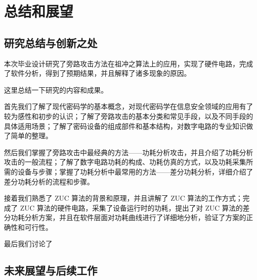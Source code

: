 
\chapter{总结和展望}

\label{chap:conclusion}

\section{研究总结与创新之处}

本次毕业设计研究了旁路攻击方法在祖冲之算法上的应用，实现了硬件电路，完成了软件分析，得到了预期结果，并且解释了诸多现象的原因。

\vspace*{0.5\baselineskip}

这里总结一下研究的内容和成果。

首先我们了解了现代密码学的基本概念，对现代密码学在信息安全领域的应用有了较为感性和初步的认识；了解了旁路攻击的基本分类和常见手段，以及不同手段的具体适用场景；了解了密码设备的组成部件和基本结构，对数字电路的专业知识做了简单的整理。

然后我们掌握了旁路攻击中最经典的方法——功耗分析攻击，并且介绍了功耗分析攻击的一般流程；了解了数字电路功耗的构成、功耗仿真的方式，以及功耗采集所需的设备与步骤；掌握了功耗分析中最常用的方法——差分功耗分析，详细介绍了差分功耗分析的流程和步骤。

接着我们熟悉了 ZUC 算法的背景和原理，并且讲解了 ZUC 算法的工作方式；完成了 ZUC 算法的硬件电路，采集了设备运行时的功耗，提出了对 ZUC 算法的差分功耗分析方案，并且在软件层面对功耗曲线进行了详细地分析，验证了方案的正确性和可行性。

最后我们讨论了

\vspace*{0.5\baselineskip}



\section{未来展望与后续工作}



